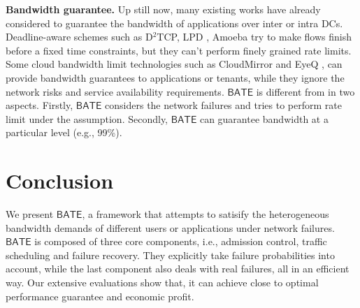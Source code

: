 \documentclass[sigconf]{acmart}
\begin{document}
\textbf{Bandwidth guarantee.}
Up still now, many existing works have already considered to guarantee the bandwidth of applications over inter or intra DCs.
Deadline-aware schemes such as D$^2$TCP\cite{D2TCP}, LPD \cite{LPD}, Amoeba\cite{Guaranteeings}  try to make flows finish before a fixed time constraints,
but they can't perform finely grained rate limits.
Some cloud bandwidth limit technologies such as CloudMirror \cite{appdriven} and EyeQ \cite{EyeQ}, can provide bandwidth guarantees to applications or tenants, while they ignore the network risks and service availability requirements.
$\mathsf{BATE}$ is different from in two aspects.
Firstly, $\mathsf{BATE}$ considers the network failures and tries to perform rate limit under the assumption.
Secondly, $\mathsf{BATE}$ can guarantee bandwidth at a particular level (e.g., 99\%). 
\fi
\section{Conclusion}
We present $\mathsf{BATE}$, a framework that attempts to satisify the heterogeneous bandwidth demands of different users or applications under network failures. 
$\mathsf{BATE}$ is composed of three core components, i.e., admission control, traffic scheduling and failure recovery. They explicitly take failure probabilities into account, while the last 
component also deals with real failures, all in an efficient way. 
Our extensive evaluations show that, it can achieve close to optimal performance guarantee 
and economic profit. 

\end{document}
